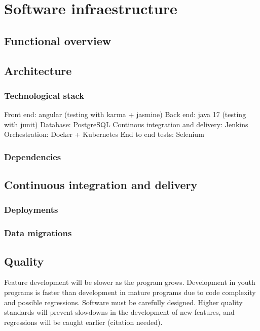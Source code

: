 \documentclass[11pt,english]{article} %
\begin{document}
\maketitle
\tableofcontents %
\setlength\parindent{0pt} %

\newpage

\section{Software infraestructure}


\subsection{Functional overview}


\subsection{Architecture}
\subsubsection{Technological stack}
Front end: angular (testing with karma + jasmine)
Back end: java 17 (testing with junit)
Database: PostgreSQL
Continous integration and delivery: Jenkins
Orchestration: Docker + Kubernetes
End to end tests: Selenium

\subsubsection{Dependencies}

\subsection{Continuous integration and delivery}
\subsubsection{Deployments}
\subsubsection{Data migrations}


\subsection{Quality}
Feature development will be slower as the program grows. Development in youth programs is faster than development in mature programs due to code complexity and possible regressions.
Software must be carefully designed. Higher quality standards will prevent slowdowns in the development of new features, and regressions will be caught earlier (citation needed).
\end{document}
